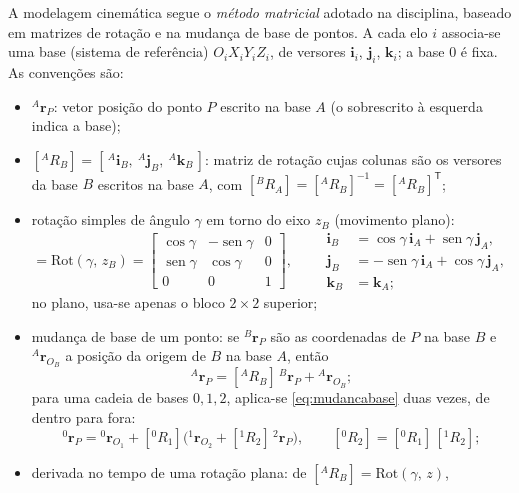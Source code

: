\documentclass[12pt,a4paper,twoside]{article}
\DeclareMathOperator{\sen}{sen}
\newcommand{\rv}[2]{{}^{#1}\mathbf{r}_{#2}}          %
\newcommand{\Rm}[2]{[{}^{#1}R_{#2}]}                 %
\newcommand{\Rot}[2]{\mathrm{Rot}(#1,\,#2)}
\numberwithin{equation}{section}
\begin{document}
A modelagem cinemática segue o \emph{método matricial} adotado na disciplina, baseado em
matrizes de rotação e na mudança de base de pontos. A cada elo $i$ associa-se uma base (sistema de referência)
$O_iX_iY_iZ_i$, de versores $\mathbf i_i$, $\mathbf j_i$, $\mathbf k_i$; a base $0$ é fixa. As
convenções são:
\begin{itemize}
  \item $\rv{A}{P}$: vetor posição do ponto $P$ escrito na base $A$ (o sobrescrito à esquerda
  indica a base);
  \item $\Rm{A}{B} = [\,{}^{A}\mathbf i_B,\ {}^{A}\mathbf j_B,\ {}^{A}\mathbf k_B\,]$: matriz de rotação
  cujas colunas são os versores da base $B$ escritos na base $A$, com
  $\Rm{B}{A} = \Rm{A}{B}^{-1} = \Rm{A}{B}^{\mathsf T}$;
  \item rotação simples de ângulo $\gamma$ em torno do eixo $z_B$ (movimento plano):
  \begin{equation}
    \Rm{A}{B} = \Rot{\gamma}{z_B} =
    \begin{bmatrix} \cos\gamma & -\sen\gamma & 0\\ \sen\gamma & \cos\gamma & 0\\ 0 & 0 & 1 \end{bmatrix},
    \qquad
    \begin{aligned}
      \mathbf i_B &= \cos\gamma\,\mathbf i_A + \sen\gamma\,\mathbf j_A,\\
      \mathbf j_B &= -\sen\gamma\,\mathbf i_A + \cos\gamma\,\mathbf j_A,\\
      \mathbf k_B &= \mathbf k_A;
    \end{aligned}
  \end{equation}
  no plano, usa-se apenas o bloco $2\times2$ superior;
  \item mudança de base de um ponto: se $\rv{B}{P}$ são as coordenadas de $P$ na base $B$ e
  $\rv{A}{O_B}$ a posição da origem de $B$ na base $A$, então
  \begin{equation}
    \rv{A}{P} = \Rm{A}{B}\,\rv{B}{P} + \rv{A}{O_B} ;
    \label{eq:mudancabase}
  \end{equation}
  para uma cadeia de bases $0, 1, 2$, aplica-se \eqref{eq:mudancabase} duas vezes, de dentro para fora:
  \begin{equation}
    \rv{0}{P} = \rv{0}{O_1} + \Rm{0}{1}\Big(\rv{1}{O_2} + \Rm{1}{2}\,\rv{2}{P}\Big),
    \qquad
    \Rm{0}{2} = \Rm{0}{1}\,\Rm{1}{2} ;
    \label{eq:cadeia}
  \end{equation}
  \item derivada no tempo de uma rotação plana: de $\Rm{A}{B} = \Rot{\gamma}{z}$,

\end{itemize}
\end{document}
